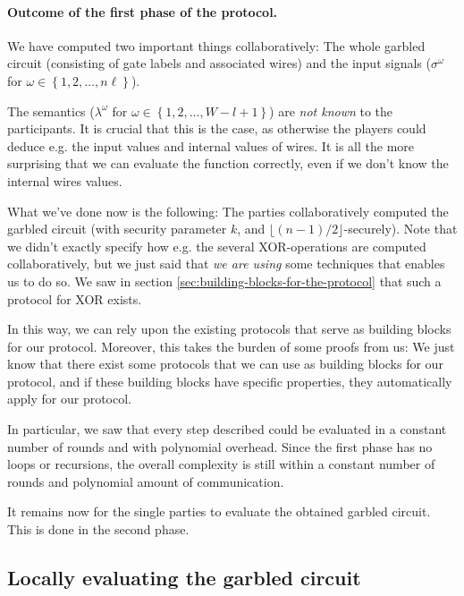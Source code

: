\paragraph{Outcome of the first phase of the protocol.}

We have computed two important things collaboratively: The whole garbled circuit (consisting of gate labels and associated wires) and the input signals ($\sigma^\omega$ for $\omega\in\left\{ 1,2,\dots,n\ell \right\}$).

The semantics ($\lambda^\omega$ for $\omega\in\left\{ 1,2,\dots,W-l+1 \right\}$) are \emph{not known} to the participants. It is crucial that this is the case, as otherwise the players could deduce e.g. the input values and internal values of wires. It is all the more surprising that we can evaluate the function correctly, even if we don't know the internal wires values.

What we've done now is the following: The parties collaboratively computed the garbled circuit (with security parameter $k$, and $\lfloor (n-1)/2 \rfloor$-securely). Note that we didn't exactly specify how e.g. the several XOR-operations are computed collaboratively, but we just said that \emph{we are using} some techniques that enables us to do so. We saw in section \ref{sec:building-blocks-for-the-protocol} that such a protocol for XOR exists.

In this way, we can rely upon the existing protocols that serve as building blocks for our protocol. Moreover, this takes the burden of some proofs from us: We just know that there exist some protocols that we can use as building blocks for our protocol, and if these building blocks have specific properties, they automatically apply for our protocol. 

In particular, we saw that every step described could be evaluated in a constant number of rounds and with polynomial overhead. Since the first phase has no loops or recursions, the overall complexity is still within a constant number of rounds and polynomial amount of communication.

It remains now for the single parties to evaluate the obtained garbled circuit. This is done in the second phase.

\subsection{Locally evaluating the garbled circuit}
\label{sec:protocoll-locally-evaluating-garbled-circuit}

